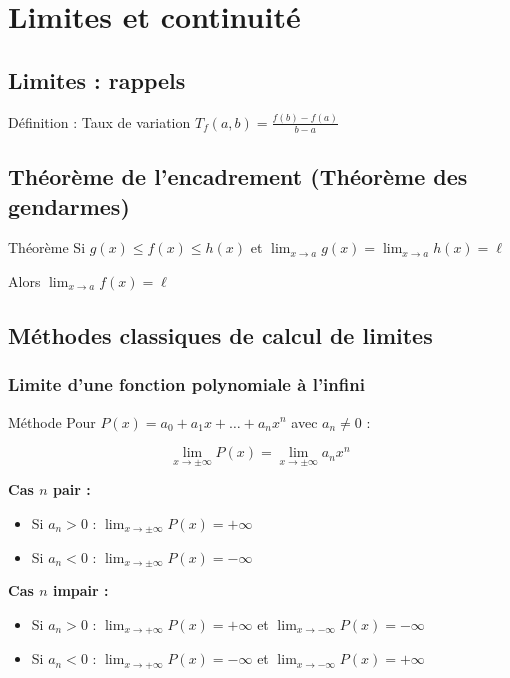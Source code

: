 \documentclass[a4paper,11pt]{article}
\begin{document}
\newpage
\section{Limites et continuité}

\subsection{Limites : rappels}

\begin{defbox}{Définition : Taux de variation}
$T_f(a,b) = \frac{f(b) - f(a)}{b - a}$
\end{defbox}

\subsection{Théorème de l'encadrement (Théorème des gendarmes)}

\begin{theorembox}{Théorème}
Si $g(x) \leq f(x) \leq h(x)$ et $\lim_{x \to a} g(x) = \lim_{x \to a} h(x) = \ell$

Alors $\lim_{x \to a} f(x) = \ell$
\end{theorembox}

\subsection{Méthodes classiques de calcul de limites}

\subsubsection{Limite d'une fonction polynomiale à l'infini}

\begin{methodbox}{Méthode}
Pour $P(x) = a_0 + a_1x + \ldots + a_nx^n$ avec $a_n \neq 0$ :

\[\lim_{x \to \pm\infty} P(x) = \lim_{x \to \pm\infty} a_nx^n\]

\textbf{Cas $n$ pair :}
\begin{itemize}
    \item Si $a_n > 0$ : $\lim_{x \to \pm\infty} P(x) = +\infty$
    \item Si $a_n < 0$ : $\lim_{x \to \pm\infty} P(x) = -\infty$
\end{itemize}

\textbf{Cas $n$ impair :}
\begin{itemize}
    \item Si $a_n > 0$ : $\lim_{x \to +\infty} P(x) = +\infty$ et $\lim_{x \to -\infty} P(x) = -\infty$
    \item Si $a_n < 0$ : $\lim_{x \to +\infty} P(x) = -\infty$ et $\lim_{x \to -\infty} P(x) = +\infty$
\end{itemize}
\end{methodbox}
\end{document}
